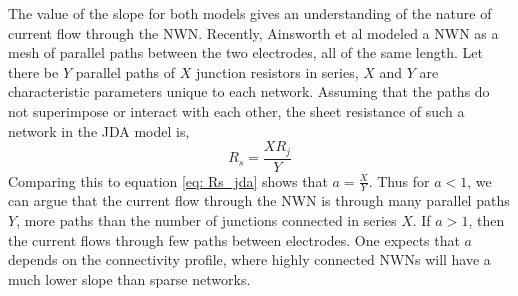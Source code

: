 The value of the slope for both models gives an understanding of the nature of current flow through the NWN. Recently, Ainsworth\cite{ainsworth2018} et al modeled a NWN as a mesh of parallel paths between the two electrodes, all of the same length. Let there be $Y$ parallel paths of $X$ junction resistors in series, $X$ and $Y$ are characteristic parameters unique to each network. Assuming that the paths do not superimpose or interact with each other, the sheet resistance of such a network in the JDA model is,
\begin{equation}
R_s = \frac{X R_j}{Y} 
\end{equation}
Comparing this to equation \ref{eq: Rs_jda} shows that $a = \frac{X}{Y}$. Thus for $a<1$, we can argue that the current flow through the NWN is through many parallel paths $Y$, more paths than the number of junctions connected in series $X$. If $a>1$, then the current flows through few paths between electrodes. One expects that $a$ depends on the connectivity profile, where highly connected NWNs will have a much lower slope than sparse networks.

